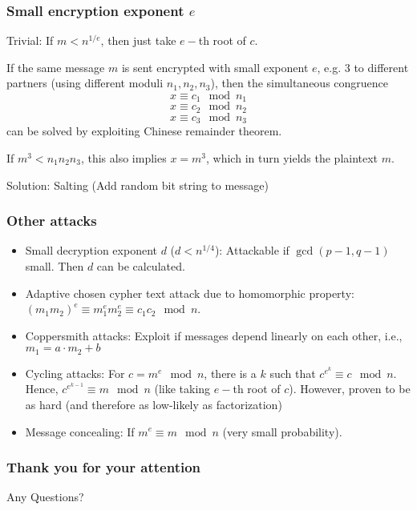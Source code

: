 \documentclass{beamer}
\begin{document}
\begin{frame}
\frametitle{Small encryption exponent $e$}
Trivial: If $m<n^{1/e}$, then just take $e-$th root of $c$.\pause

If the same message $m$ is sent encrypted with small exponent $e$, e.g. $3$ to different partners (using different moduli $n_1,n_2,n_3$), then the simultaneous congruence 
\[x\equiv c_1\mod n_1\]
\[x\equiv c_2 \mod n_2\]
\[x\equiv c_3\mod n_3\] can be solved by exploiting Chinese remainder theorem. 

If $m^3<n_1n_2n_3$, this also implies $x=m^3$, which in turn yields the plaintext $m$.

Solution: Salting (Add random bit string to message)
\end{frame}

\begin{frame}
\frametitle{Other attacks}
\begin{itemize} 
  \item Small decryption exponent $d$ ($d<n^{1/4}$): Attackable if $\gcd(p-1,q-1)$ small. Then $d$ can be calculated.
  \item Adaptive chosen cypher text attack due to homomorphic property: $(m_1m_2)^e\equiv m_1^em_2^e\equiv c_1c_2\mod n$.
  \item Coppersmith attacks: Exploit if messages depend linearly on each other, i.e., $m_1=a\cdot m_2+b$
  \item Cycling attacks: For $c=m^e\mod n$, there is a $k$ such that $c^{e^k}\equiv c\mod n$. Hence, $c^{e^{k-1}}\equiv m\mod n$ (like taking $e-$th root of $c$). However, proven to be as hard (and therefore as low-likely as factorization)
  \item Message concealing: If $m^e\equiv m\mod n$ (very small probability).
\end{itemize}
\end{frame}

\begin{frame}
\frametitle{Thank you for your attention}
\begin{figure}
\end{figure}
\begin{center}
Any Questions?
\end{center}
\end{frame}
\end{document}
